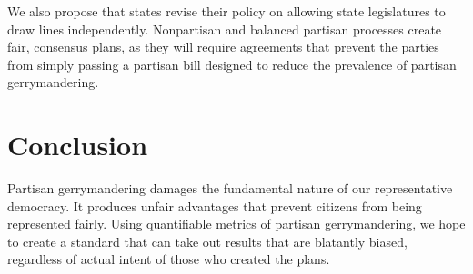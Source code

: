\documentclass[12pt]{article}
\begin{document}
  We also propose that states revise their policy on allowing state legislatures to draw lines independently.  Nonpartisan and balanced partisan processes create fair, consensus plans, as they will require agreements that prevent the parties from simply passing a partisan bill designed to reduce the prevalence of partisan gerrymandering.

  \section{Conclusion}
  Partisan gerrymandering damages the fundamental nature of our representative democracy.  It produces unfair advantages that prevent citizens from being represented fairly.  Using quantifiable metrics of partisan gerrymandering, we hope to create a standard that can take out results that are blatantly biased, regardless of actual intent of those who created the plans.


  \singlespacing{}

  \printbibliography{}
\end{document}
